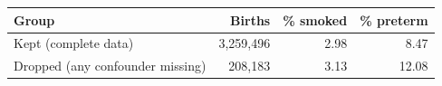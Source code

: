 {\small
\begin{tabular}{lrrr}
\toprule
Group & Births & \% smoked & \% preterm \\
\midrule
Kept (complete data) & 3,259,496 & 2.98 & 8.47 \\
Dropped (any confounder missing) & 208,183 & 3.13 & 12.08 \\
\bottomrule
\end{tabular}
}
